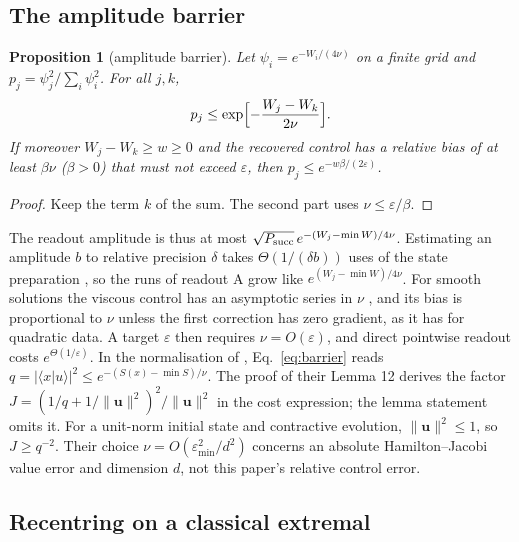 \documentclass[11pt,a4paper]{article}
\newtheorem{proposition}{Proposition}
\theoremstyle{remark}
\newcommand{\eps}{\varepsilon}
\newcommand{\Psucc}{P_{\rm succ}}
\begin{document}
\subsection{The amplitude barrier}

\begin{proposition}[amplitude barrier]
\label{prop:barrier}
Let $\psi_i=e^{-W_i/(4\nu)}$ on a finite grid and $p_j=\psi_j^2/\sum_i\psi_i^2$. For all $j,k$,
\begin{equation}
 p_j\le\exp\Bigl[-\frac{W_j-W_k}{2\nu}\Bigr].
 \label{eq:barrier}
\end{equation}
If moreover $W_j-W_k\ge w\ge0$ and the recovered control has a relative bias of at least $\beta\nu$ ($\beta>0$) that
must not exceed $\eps$, then $p_j\le e^{-w\beta/(2\eps)}$.
\end{proposition}
\begin{proof}
Keep the term $k$ of the sum. The second part uses $\nu\le\eps/\beta$.
\end{proof}

The readout amplitude is thus at most $\sqrt{\Psucc}\,e^{-(W_j-\min W)/4\nu}$. Estimating an amplitude $b$ to
relative precision $\delta$ takes $\Theta(1/(\delta b))$ uses of the state preparation
\cite{bhmt,nayakwu}, so the runs of readout A grow like $e^{(W_j-\min W)/4\nu}$. For
smooth solutions the viscous control has an asymptotic series in $\nu$ \cite{flemingsouganidis}, and its bias is
proportional to $\nu$ unless the first correction has zero gradient, as it has for quadratic
data. A target $\eps$ then requires $\nu=O(\eps)$, and direct pointwise readout costs $e^{\Theta(1/\eps)}$.
In the normalisation of \cite{jinliu}, Eq.~\eqref{eq:barrier} reads
$q=|\langle x|u\rangle|^2\le e^{-(S(x)-\min S)/\nu}$. The proof of their Lemma 12
derives the factor
$J=(1/q+1/\|\mathbf u\|^2)^2/\|\mathbf u\|^2$ in the cost expression; the lemma statement
omits it. For a unit-norm initial state and contractive evolution, $\|\mathbf u\|^2\leq1$,
so $J\geq q^{-2}$. Their choice $\nu=O(\eps_{\min}^2/d^2)$ concerns an absolute
Hamilton--Jacobi value error and dimension $d$, not this paper's relative control error.

\subsection{Recentring on a classical extremal}
\end{document}
